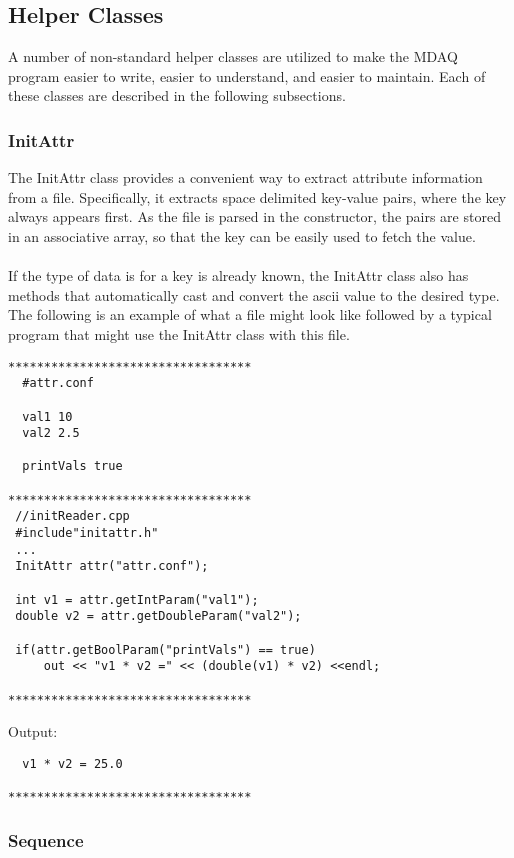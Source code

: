 \subsection{Helper Classes}

A number of non-standard helper classes are utilized to make the MDAQ program easier
to write, easier to understand, and easier to maintain. Each of these classes are
described in the following subsections.
  
\subsubsection{InitAttr}

The InitAttr class provides a convenient way to extract attribute information from
a file. Specifically, it extracts space delimited key-value pairs, where the key
always appears first. As the file is parsed in the constructor, the pairs are stored
in an associative array, so that the key can be easily used to fetch the value. \\
\\
If the type of data is for a key is already known, the InitAttr class also has methods
that automatically cast and convert the ascii value to the desired type. The following is
an example of what a file might look like followed by a typical program that might use the 
InitAttr class with this file.

\begin{verbatim}
**********************************
  #attr.conf

  val1 10
  val2 2.5

  printVals true

**********************************
 //initReader.cpp
 #include"initattr.h"
 ...
 InitAttr attr("attr.conf");

 int v1 = attr.getIntParam("val1");
 double v2 = attr.getDoubleParam("val2");

 if(attr.getBoolParam("printVals") == true)
     out << "v1 * v2 =" << (double(v1) * v2) <<endl;

**********************************
\end{verbatim} 
Output:
\begin{verbatim}
  v1 * v2 = 25.0

**********************************
\end{verbatim} 

\subsubsection{Sequence}

